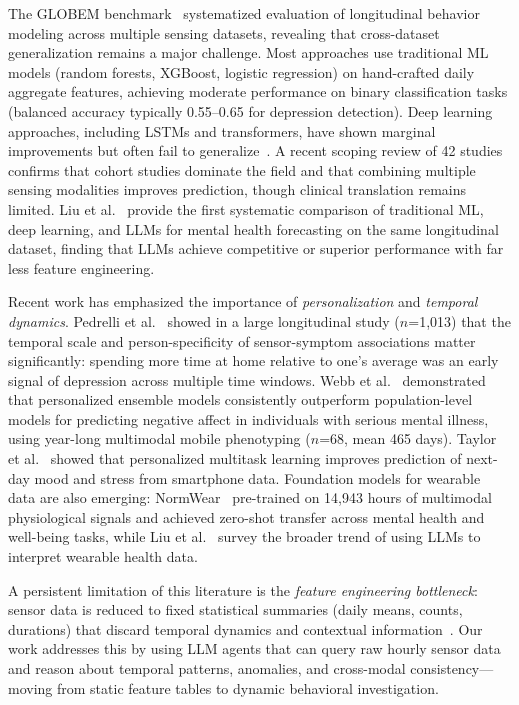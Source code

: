 \documentclass[screen,review,anonymous]{acmart}
\begin{document}
The GLOBEM benchmark~\cite{xu2023globem} systematized evaluation of longitudinal behavior modeling across multiple sensing datasets, revealing that cross-dataset generalization remains a major challenge. Most approaches use traditional ML models (random forests, XGBoost, logistic regression) on hand-crafted daily aggregate features, achieving moderate performance on binary classification tasks (balanced accuracy typically 0.55--0.65 for depression detection). Deep learning approaches, including LSTMs and transformers, have shown marginal improvements but often fail to generalize~\cite{shen2025passive_sensing_review}. A recent scoping review of 42 studies~\cite{shen2025passive_sensing_review} confirms that cohort studies dominate the field and that combining multiple sensing modalities improves prediction, though clinical translation remains limited. Liu et al.~\cite{liu2025comparative_ml_dl_llm} provide the first systematic comparison of traditional ML, deep learning, and LLMs for mental health forecasting on the same longitudinal dataset, finding that LLMs achieve competitive or superior performance with far less feature engineering.

Recent work has emphasized the importance of \emph{personalization} and \emph{temporal dynamics}. Pedrelli et al.~\cite{pedrelli2024temporal} showed in a large longitudinal study ($n$=1,013) that the temporal scale and person-specificity of sensor-symptom associations matter significantly: spending more time at home relative to one's average was an early signal of depression across multiple time windows. Webb et al.~\cite{webb2025personalized} demonstrated that personalized ensemble models consistently outperform population-level models for predicting negative affect in individuals with serious mental illness, using year-long multimodal mobile phenotyping ($n$=68, mean 465 days). Taylor et al.~\cite{taylor2017personalization} showed that personalized multitask learning improves prediction of next-day mood and stress from smartphone data. Foundation models for wearable data are also emerging: NormWear~\cite{luo2025normwear} pre-trained on 14,943 hours of multimodal physiological signals and achieved zero-shot transfer across mental health and well-being tasks, while Liu et al.~\cite{liu2024rise_llm_wearable} survey the broader trend of using LLMs to interpret wearable health data.

A persistent limitation of this literature is the \emph{feature engineering bottleneck}: sensor data is reduced to fixed statistical summaries (daily means, counts, durations) that discard temporal dynamics and contextual information~\cite{xu2023globem}. Our work addresses this by using LLM agents that can query raw hourly sensor data and reason about temporal patterns, anomalies, and cross-modal consistency---moving from static feature tables to dynamic behavioral investigation.
\end{document}
